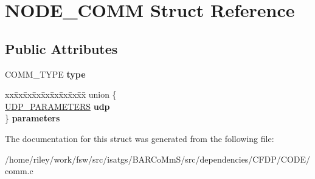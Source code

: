 \hypertarget{struct_n_o_d_e___c_o_m_m}{}\section{N\+O\+D\+E\+\_\+\+C\+O\+MM Struct Reference}
\label{struct_n_o_d_e___c_o_m_m}
\subsection*{Public Attributes}
\begin{DoxyCompactItemize}
\item 
C\+O\+M\+M\+\_\+\+T\+Y\+PE {\bfseries type}\hypertarget{struct_n_o_d_e___c_o_m_m_ae294165d1e79a7915f8cdae0d7e8bbff}{}\label{struct_n_o_d_e___c_o_m_m_ae294165d1e79a7915f8cdae0d7e8bbff}

\item 
\begin{tabbing}
xx\=xx\=xx\=xx\=xx\=xx\=xx\=xx\=xx\=\kill
union \{\\
\>\hyperlink{struct_u_d_p___p_a_r_a_m_e_t_e_r_s}{UDP\_PARAMETERS} {\bfseries udp}\\
\} {\bfseries parameters}\hypertarget{struct_n_o_d_e___c_o_m_m_ae8384f18a81031b64f98fdb5f37e8f55}{}\label{struct_n_o_d_e___c_o_m_m_ae8384f18a81031b64f98fdb5f37e8f55}
\\

\end{tabbing}\end{DoxyCompactItemize}


The documentation for this struct was generated from the following file\+:\begin{DoxyCompactItemize}
\item 
/home/riley/work/fsw/src/isatgs/\+B\+A\+R\+Co\+Mm\+S/src/dependencies/\+C\+F\+D\+P/\+C\+O\+D\+E/comm.\+c\end{DoxyCompactItemize}
